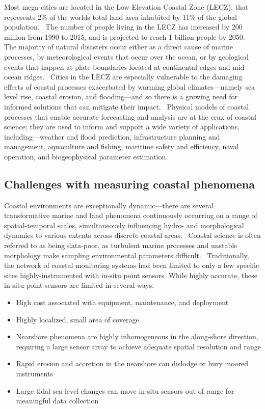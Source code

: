 \documentclass[12pt]{article}
\begin{document}
Most mega-cities are located in the Low Elevation Coastal Zone (LECZ), that represents 2\% of the worlds total land area inhabited by 11\% of the global population.~\cite{Neumann2015} The number of people living in the LECZ has increased by 200 million from 1990 to 2015, and is projected to reach 1 billion people by 2050.~\cite{Neumann2015} The majority of natural disasters occur either as a direct cause of marine processes, by meteorological events that occur over the ocean, or by geological events that happen at plate boundaries located at continental edges and mid-ocean ridges.~\cite{Kron2013} Cities in the LECZ are especially vulnerable to the damaging effects of coastal processes exacerbated by warming global climates---namely sea level rise, coastal erosion, and flooding---and so there is a growing need for informed solutions that can mitigate their impact.~\cite{Neumann2015, Day2023} Physical models of coastal processes that enable accurate forecasting and analysis are at the crux of coastal science; they are used to inform and support a wide variety of applications, including---weather and flood prediction, infrastructure planning and management, aquaculture and fishing, maritime safety and efficiency, naval operation, and biogeophysical parameter estimation.~\cite{DeMeyFreemaux2009, Vitousek2023, VanDongeren2008}

\subsection{Challenges with measuring coastal phenomena}
Coastal environments are exceptionally dynamic---there are several transformative marine and land phenomena continuously occurring on a range of spatial-temporal scales, simultaneously influencing hydro- and morphological dynamics to various extents across discrete coastal areas.~\cite{Hunt2023} Coastal science is often referred to as being data-poor, as turbulent marine processes and unstable morphology make sampling environmental parameters difficult.~\cite{Vitousek2023, Holman2013} Traditionally, the network of coastal monitoring systems had been limited to only a few specific sites highly-instrumented with in-situ point sensors. While highly accurate, these in-situ point sensors are limited in several ways:

 {\small
 \begin{itemize}
    \item High cost associated with equipment, maintenance, and deployment
    \item Highly localized, small area of coverage
    \item Nearshore phenomena are highly inhomogeneous in the along-shore direction, requiring a large sensor array to achieve adequate spatial resolution and range
    \item Rapid erosion and accretion in the nearshore can dislodge or bury moored instruments
    \item Large tidal sea-level changes can move in‐situ sensors out of range for meaningful data collection
\end{itemize}
}
~\cite{Vitousek2023, Holman2013}
\end{document}
